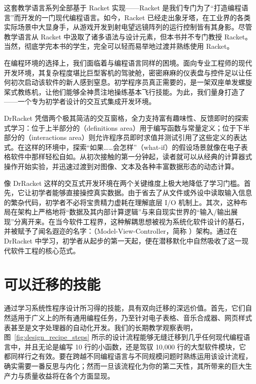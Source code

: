 \begin{notebox}
这套教学语言系列全部基于 Racket 实现——Racket 是我们专门为了“打造编程语言”而开发的一门现代编程语言。如今，Racket 已经走出象牙塔，在工业界的各类实际场景中大显身手，从游戏开发到射电望远镜阵列的运行控制皆有其身影。尽管教学语言从 Racket 中汲取了诸多语法与设计元素，但本书并不专门教授 Racket。当然，彻底学完本书的学生，完全可以轻而易举地过渡并熟练使用 Racket。
\end{notebox}

在编程环境的选择上，我们面临着与编程语言同样的困境。面向专业工程师的现代开发环境，其复杂程度堪比巨型客机的驾驶舱，密密麻麻的仪表盘与控件足以让任何初次启动该软件的新人感到窒息。初学程序员真正需要的，是一架双座单发螺旋桨式教练机，让他们能够全神贯注地操练基本飞行技能。为此，我们量身打造了 ——一个专为初学者设计的交互式集成开发环境。

DrRacket 凭借两个极其简洁的交互窗格，全力支持富有趣味性、反馈即时的探索式学习：位于上半部分的（definitions area）用于编写函数与常量定义；位于下半部分的（interactions area）则允许程序员即时求值并测试引用了这些定义的表达式。在这样的环境中，探索“如果……会怎样”（what-if）的假设场景就像在电子表格软件中那样轻松自如。从初次接触的第一分钟起，读者就可以从经典的计算器式操作开始实验，并迅速过渡到对图像、文本及各种丰富数据形态的动态计算。

像 DrRacket 这样的交互式开发环境在两个关键维度上极大地降低了学习门槛。首先，它让初学者能够直接操控真实数据。由于省去了从文件或外设中读取输入信息的繁杂代码，初学者不必将宝贵精力虚耗在理解底层 I/O 机制上。其次，这种布局在架构上严格地将“数据及其内部计算逻辑”与来自现实世界的“输入/输出展现”分离开来。在当今软件工程界，这种解耦思想被视为系统化软件设计的基石，并被赋予了闻名遐迩的名字：（Model-View-Controller，简称 ）架构。通过在 DrRacket 中学习，初学者从起步的第一天起，便在潜移默化中自然吸收了这一现代软件工程的核心范式。


\section*{可以迁移的技能}
\label{sec:preface:skills_transfer}

通过学习系统性程序设计所习得的技能，具有双向迁移的深远价值。首先，它们自然适用于广义上的所有通用编程任务，乃至针对电子表格、音乐合成器、网页样式表甚至是文字处理器的自动化开发。我们的长期教学观察表明，图~\ref{fig:design_recipe_steps} 所示的设计流程能够无缝迁移到几乎任何现代编程语言中，并且无论是编写 10 行的小函数，还是驾驭 10,000 行的大型软件模块，它都同样行之有效。要在跨越不同编程语言与不同规模问题时熟练运用该设计流程，确实需要一番反思与内化；然而一旦该流程化为你的第二天性，其所带来的巨大生产力与质量收益将在各个方面显现。

